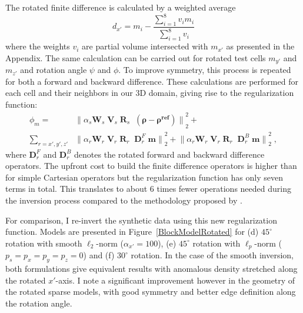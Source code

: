 The rotated finite difference is calculated by a weighted average
\begin{equation}
d_{x'} = m_i - \frac{\sum_{i=1}^8 v_i m_i}{\sum_{i=1}^8 v_i}
\end{equation}
where the weights $v_i$ are partial volume intersected with $m_{x'}$ as presented in the Appendix.
The same calculation can be carried out for rotated test cells $m_{y'}$ and $m_{z'}$ and rotation angle $\psi$ and $\phi$. To improve symmetry, this process is repeated for both a forward and backward difference.
These calculations are performed for each cell and their neighbors in our 3D domain, giving rise to the regularization function:
\begin{equation} \label{phi_m_ROT}
\begin{split}
\phi_m
= &{\|\alpha_s \mathbf{W}_s\;\mathbf{V}_s\;\mathbf{R}_s\; \;( \boldsymbol{\rho - \rho^{ref}})\|}^2_2 + \\
\sum_{r = x',y',z'}& {\|\alpha_r\mathbf{W}_r\;\mathbf{V}_r\;\mathbf{R}_r \; \; \mathbf{D}^F_r \; \mathbf{m}\|}^2_2 + {\|\alpha_r\mathbf{W}_r\;\mathbf{V}_r\;\mathbf{R}_r \; \; \mathbf{D}^B_r \; \mathbf{m}\|}^2_2 \;,
\end{split}
\end{equation}
where $\mathbf{D}^F_r$ and $\mathbf{D}^B_r$ denotes the rotated forward and backward difference operators. The upfront cost to build the finite difference operators is higher than for simple Cartesian operators but the regularization function has only seven terms in total. This translates to about 6 times fewer operations needed during the inversion process compared to the methodology proposed by \cite{PhDLelievre09}.

For comparison, I re-invert the synthetic data using this new regularization function. Models are presented in Figure~\ref{BlockModelRotated} for (d) $45^\circ$ rotation with smooth $\ell_2$-norm ($\alpha_{x'}=100$), (e) $45^\circ$ rotation with $\ell_p$-norm ($p_s=p_x=p_y=p_z=0$) and (f) $30^\circ$ rotation. In the case of the smooth inversion, both formulations give equivalent results with anomalous density stretched along the rotated $x'$-axis. I note a significant improvement however in the geometry of the rotated sparse models, with good symmetry and better edge definition along the rotation angle.

